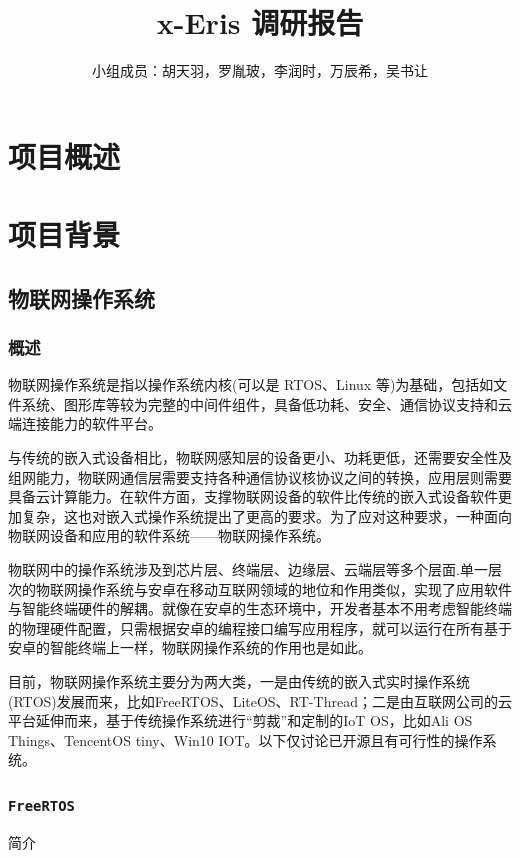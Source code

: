 \documentclass[UTF8,a4paper]{ctexart}
\title{\textbf{x-Eris 调研报告}}
\author{小组成员：胡天羽，罗胤玻，李润时，万辰希，吴书让}
\begin{document}
\maketitle

\section{项目概述}
\section{项目背景}
\subsection{物联网操作系统}
\subsubsection{概述}
物联网操作系统是指以操作系统内核(可以是 RTOS、Linux 等)为基础，包括如文件系统、图形库等较为完整的中间件组件，具备低功耗、安全、通信协议支持和云端连接能力的软件平台。

与传统的嵌入式设备相比，物联网感知层的设备更小、功耗更低，还需要安全性及组网能力，物联网通信层需要支持各种通信协议核协议之间的转换，应用层则需要具备云计算能力。在软件方面，支撑物联网设备的软件比传统的嵌入式设备软件更加复杂，这也对嵌入式操作系统提出了更高的要求。为了应对这种要求，一种面向物联网设备和应用的软件系统——物联网操作系统。

物联网中的操作系统涉及到芯片层、终端层、边缘层、云端层等多个层面.单一层次的物联网操作系统与安卓在移动互联网领域的地位和作用类似，实现了应用软件与智能终端硬件的解耦。就像在安卓的生态环境中，开发者基本不用考虑智能终端的物理硬件配置，只需根据安卓的编程接口编写应用程序，就可以运行在所有基于安卓的智能终端上一样，物联网操作系统的作用也是如此。

目前，物联网操作系统主要分为两大类，一是由传统的嵌入式实时操作系统(RTOS)发展而来，比如FreeRTOS、LiteOS、RT-Thread；二是由互联网公司的云平台延伸而来，基于传统操作系统进行“剪裁”和定制的IoT OS，比如Ali OS Things、TencentOS tiny、Win10 IOT。以下仅讨论已开源且有可行性的操作系统。

\subsubsection{\texttt{FreeRTOS}}
\item 简介
\end{document}
